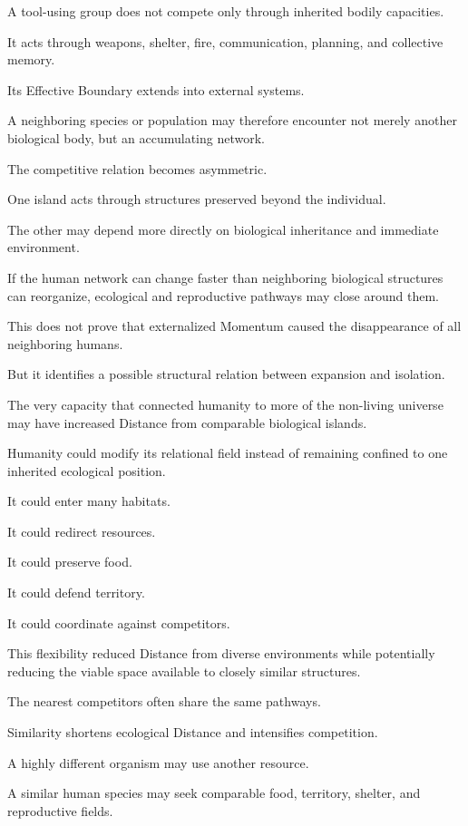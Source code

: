 A tool-using group does not compete only through inherited bodily capacities.

It acts through weapons, shelter, fire, communication, planning, and collective memory.

Its Effective Boundary extends into external systems.

A neighboring species or population may therefore encounter not merely another biological body, but an accumulating network.

The competitive relation becomes asymmetric.

One island acts through structures preserved beyond the individual.

The other may depend more directly on biological inheritance and immediate environment.

If the human network can change faster than neighboring biological structures can reorganize, ecological and reproductive pathways may close around them.

This does not prove that externalized Momentum caused the disappearance of all neighboring humans.

But it identifies a possible structural relation between expansion and isolation.

The very capacity that connected humanity to more of the non-living universe may have increased Distance from comparable biological islands.

Humanity could modify its relational field instead of remaining confined to one inherited ecological position.

It could enter many habitats.

It could redirect resources.

It could preserve food.

It could defend territory.

It could coordinate against competitors.

This flexibility reduced Distance from diverse environments while potentially reducing the viable space available to closely similar structures.

The nearest competitors often share the same pathways.

Similarity shortens ecological Distance and intensifies competition.

A highly different organism may use another resource.

A similar human species may seek comparable food, territory, shelter, and reproductive fields.

